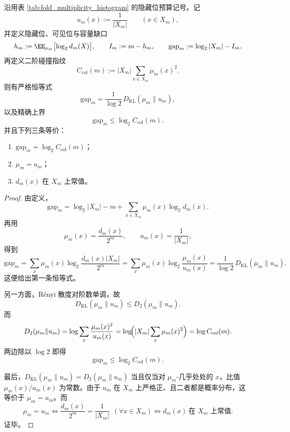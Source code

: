 \begin{theorem}\label{thm:xi-time-part60ab-hidden-gap-kl-renyi2-collision}
沿用表 \ref{tab:fold_multiplicity_histogram} 的隐藏位预算记号。记
\[
u_m(x):=\frac1{|X_m|}
\qquad (x\in X_m),
\]
并定义隐藏位、可见位与容量缺口
\[
h_m:=\EE_{\mu_m}\bigl[\log_2 d_m(X)\bigr],
\qquad
I_m:=m-h_m,
\qquad
\mathrm{gap}_m:=\log_2|X_m|-I_m.
\]
再定义二阶碰撞指纹
\[
C_{\mathrm{col}}(m):=
|X_m|\sum_{x\in X_m}\mu_m(x)^2.
\]
则有严格恒等式
\[
\boxed{\;
\mathrm{gap}_m
=
\frac{1}{\log 2}\,
D_{\mathrm{KL}}(\mu_m\|u_m),\;}
\]
以及精确上界
\[
\boxed{\;
\mathrm{gap}_m
\le
\log_2 C_{\mathrm{col}}(m).\;}
\]
并且下列三条等价：
\begin{enumerate}
  \item \(\mathrm{gap}_m=\log_2 C_{\mathrm{col}}(m)\)；
  \item \(\mu_m=u_m\)；
  \item \(d_m(x)\) 在 \(X_m\) 上常值。
\end{enumerate}
\end{theorem}
\begin{proof}
由定义，
\[
\mathrm{gap}_m
=
\log_2|X_m|-m+\sum_{x\in X_m}\mu_m(x)\log_2 d_m(x).
\]
再用
\[
\mu_m(x)=\frac{d_m(x)}{2^m},
\qquad
u_m(x)=\frac1{|X_m|},
\]
得到
\[
\mathrm{gap}_m
=
\sum_x \mu_m(x)\log_2\frac{d_m(x)|X_m|}{2^m}
=
\sum_x \mu_m(x)\log_2\frac{\mu_m(x)}{u_m(x)}
=
\frac{1}{\log 2}\,D_{\mathrm{KL}}(\mu_m\|u_m).
\]
这便给出第一条恒等式。

另一方面，Rényi 散度对阶数单调，故
\[
D_{\mathrm{KL}}(\mu_m\|u_m)\le D_2(\mu_m\|u_m).
\]
而
\[
D_2(\mu_m\|u_m)
=
\log\sum_x \frac{\mu_m(x)^2}{u_m(x)}
=
\log\!\Bigl(|X_m|\sum_x \mu_m(x)^2\Bigr)
=
\log C_{\mathrm{col}}(m).
\]
两边除以 \(\log 2\) 即得
\[
\mathrm{gap}_m\le \log_2 C_{\mathrm{col}}(m).
\]

最后，\(D_{\mathrm{KL}}(\mu_m\|u_m)=D_2(\mu_m\|u_m)\) 当且仅当对 \(\mu_m\)-几乎处处的 \(x\)，比值 \(\mu_m(x)/u_m(x)\) 为常数。由于 \(u_m\) 在 \(X_m\) 上严格正、且二者都是概率分布，这等价于 \(\mu_m=u_m\)。而
\[
\mu_m=u_m
\iff
\frac{d_m(x)}{2^m}=\frac1{|X_m|}
\ \ (\forall x\in X_m)
\iff
d_m(x)\ \text{在 }X_m\text{ 上常值}.
\]
证毕。
\end{proof}

